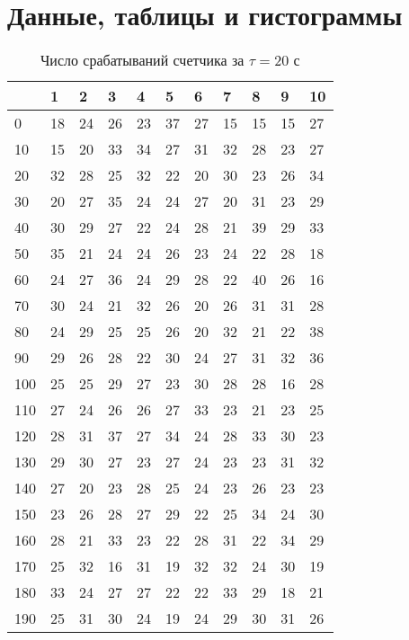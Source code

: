 \documentclass[a4paper]{article}
\begin{document}
\newpage



\section{Данные, таблицы и гистограммы}
\begin{table}[!h]
\begin{center}
\begin{tabular}{|l|l|l|l|l|l|l|l|l|l|l|}
\hline
        & 1  & 2  & 3  & 4  & 5  & 6  & 7  & 8  & 9  & 10  \\ \hline
0       & 18 & 24 & 26 & 23 & 37 & 27 & 15 & 15 & 15 & 27 \\ \hline
10      & 15 & 20 & 33 & 34 & 27 & 31 & 32 & 28 & 23 & 27 \\ \hline
20      & 32 & 28 & 25 & 32 & 22 & 20 & 30 & 23 & 26 & 34 \\ \hline
30      & 20 & 27 & 35 & 24 & 24 &27 & 20 & 31 & 23 & 29 \\ \hline
40      & 30 & 29 & 27 & 22 & 24 & 28 & 21 & 39 & 29 & 33 \\ \hline
50      & 35 & 21 & 24 & 24 & 26 & 23 & 24 & 22 & 28 & 18 \\ \hline
60      & 24 & 27 & 36 & 24 & 29 & 28 & 22 & 40 & 26 & 16 \\ \hline
70      & 30 & 24 & 21 & 32 & 26 & 20 & 26 & 31 & 31 & 28 \\ \hline
80      & 24 & 29 & 25 & 25 & 26 & 20 & 32 & 21 & 22 & 38 \\ \hline
90      & 29 & 26 & 28 & 22 & 30 & 24 & 27 & 31 & 32 & 36 \\ \hline
100     & 25 & 25 & 29 & 27 & 23 & 30 & 28 & 28 & 16 & 28 \\ \hline
110     & 27 & 24 & 26 & 26 & 27 & 33 & 23 & 21 & 23 & 25 \\ \hline
120     & 28 & 31 & 37 & 27 & 34 & 24 & 28 & 33 & 30 & 23 \\ \hline
130     & 29 & 30 & 27 & 23 & 27 & 24 & 23 & 23 & 31 & 32 \\ \hline
140     & 27 & 20 & 23 & 28 & 25 & 24 & 23 & 26 & 23 & 23 \\ \hline
150     & 23 & 26 & 28 & 27 & 29 & 22 & 25 & 34 & 24 & 30 \\ \hline
160     & 28 & 21 & 33 & 23 & 22 & 28 & 31 & 22 & 34 & 29 \\ \hline
170     & 25 & 32 & 16 & 31 & 19 & 32 & 32 & 24 & 30 & 19 \\ \hline
180     & 33 & 24 & 27 & 27 & 22 & 22 & 33 & 29 & 18 & 21 \\ \hline
190     & 25 & 31 & 30 & 24 & 19 & 24 & 29 & 30 & 31 & 26 \\ \hline
\end{tabular}
\caption{Число срабатываний счетчика за $\tau = 20$ с}
\end{center}
\end{table}
\end{document}
